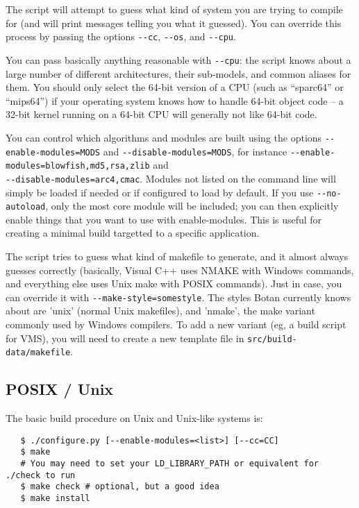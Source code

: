 \documentclass{article}
\newcommand{\filename}[1]{\texttt{#1}}
\begin{document}
The script will attempt to guess what kind of system you are trying
to compile for (and will print messages telling you what it guessed).
You can override this process by passing the options \verb|--cc|,
\verb|--os|, and \verb|--cpu|.

You can pass basically anything reasonable with \verb|--cpu|: the
script knows about a large number of different architectures, their
sub-models, and common aliases for them. You should only select the
64-bit version of a CPU (such as ``sparc64'' or ``mips64'') if your
operating system knows how to handle 64-bit object code -- a 32-bit
kernel running on a 64-bit CPU will generally not like 64-bit code.

You can control which algorithms and modules are built using the
options \verb|--enable-modules=MODS| and
\verb|--disable-modules=MODS|, for instance
\verb|--enable-modules=blowfish,md5,rsa,zlib| and
\\ \verb|--disable-modules=arc4,cmac|. Modules not listed on the
command line will simply be loaded if needed or if configured to load
by default. If you use \verb|--no-autoload|, only the most core module
will be included; you can then explicitly enable things that you want
to use with enable-modules. This is useful for creating a minimal
build targetted to a specific application.

The script tries to guess what kind of makefile to generate, and it
almost always guesses correctly (basically, Visual C++ uses NMAKE with
Windows commands, and everything else uses Unix make with POSIX
commands). Just in case, you can override it with
\verb|--make-style=somestyle|. The styles Botan currently knows about
are 'unix' (normal Unix makefiles), and 'nmake', the make variant
commonly used by Windows compilers. To add a new variant (eg, a build
script for VMS), you will need to create a new template file in
\filename{src/build-data/makefile}.

\pagebreak

\subsection{POSIX / Unix}

The basic build procedure on Unix and Unix-like systems is:

\begin{verbatim}
   $ ./configure.py [--enable-modules=<list>] [--cc=CC]
   $ make
   # You may need to set your LD_LIBRARY_PATH or equivalent for ./check to run
   $ make check # optional, but a good idea
   $ make install
\end{verbatim}
\end{document}

